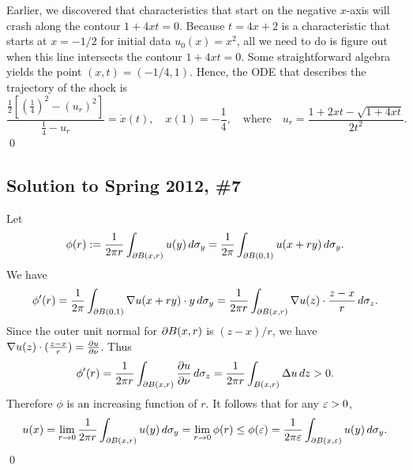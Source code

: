 \vspace{0.4cm}

Earlier, we discovered that characteristics that start on the negative $x$-axis will crash along the contour $1+4xt=0$. Because $t=4x+2$ is a characteristic that starts at $x = -1/2$ for initial data $u_0(x) = x^2$, all we need to do is figure out when this line intersects the contour $1+4xt=0$. Some straightforward algebra yields the point $(x,t) = (-1/4, 1)$. Hence, the ODE that describes the trajectory of the shock is
$$ \frac{ \frac{1}{2} \left[ \left( \frac{1}{4} \right)^2 - \left( u_r \right)^2 \right]}{\frac{1}{4} - u_r} = \dot{x}(t), \quad x(1) = -\frac{1}{4}, \quad \text{where} \quad u_r = \frac{1 + 2xt - \sqrt{1+4xt}}{2t^2}. $$ \qed

\subsection*{Solution to Spring 2012, \#7}\label{s127}
Let
$$\phi(r) := \frac{1}{2\pi r}\int_{\partial B(x, r)}u(y)\, d\sigma_{y} = \frac{1}{2\pi}\int_{\partial B(0, 1)}u(x + ry)\, d\sigma_{y}.$$
We have
\begin{align*}
\phi'(r) = \frac{1}{2\pi}\int_{\partial B(0, 1)}\nabla u(x + ry)\cdot y\, d\sigma_{y} = \frac{1}{2\pi r}\int_{\partial B(x, r)}\nabla u(z) \cdot \frac{z - x}{r}\, d\sigma_{z}.
\end{align*}
Since the outer unit normal for $\partial B(x, r)$ is $(z - x)/r$, we have $\nabla u(z) \cdot (\frac{z - x}{r}) = \frac{\partial u}{\partial \nu}$.
Thus
$$\phi'(r) = \frac{1}{2\pi r}\int_{\partial B(x, r)}\frac{\partial u}{\partial \nu}\, d\sigma_{z} = \frac{1}{2\pi r}\int_{B(x, r)}\Delta u\, dz > 0.$$
Therefore $\phi$ is an increasing function of $r$. It follows that for any $\varepsilon > 0$,
$$u(x) = \lim_{r\rightarrow 0}\frac{1}{2\pi r}\int_{\partial B(x, r)}u(y)\, d\sigma_{y} = \lim_{r \rightarrow 0}\phi(r) \leq \phi(\varepsilon) = \frac{1}{2\pi \varepsilon}\int_{\partial B(x, \varepsilon)}u(y)\, d\sigma_{y}.$$
\hfill\qed

